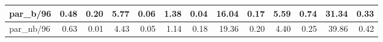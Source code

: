 \begin{tabular}{|lllllllllllll|}
\multicolumn{1}{|l|}{par\_b/96}  & \multicolumn{1}{r|}{0.48} & \multicolumn{1}{r|}{0.20} & \multicolumn{1}{r|}{5.77} & \multicolumn{1}{r|}{0.06}  & \multicolumn{1}{r|}{1.38} & \multicolumn{1}{r|}{0.04} & \multicolumn{1}{r|}{16.04} & \multicolumn{1}{r|}{0.17}  & \multicolumn{1}{r|}{5.59} & \multicolumn{1}{r|}{0.74} & \multicolumn{1}{r|}{31.34} & \multicolumn{1}{r|}{0.33}  \\ \hline
\multicolumn{1}{|l|}{par\_nb/96}  & \multicolumn{1}{r|}{0.63} & \multicolumn{1}{r|}{0.01} & \multicolumn{1}{r|}{4.43} & \multicolumn{1}{r|}{0.05}  & \multicolumn{1}{r|}{1.14} & \multicolumn{1}{r|}{0.18} & \multicolumn{1}{r|}{19.36} & \multicolumn{1}{r|}{0.20}  & \multicolumn{1}{r|}{4.40} & \multicolumn{1}{r|}{0.25} & \multicolumn{1}{r|}{39.86} & \multicolumn{1}{r|}{0.42}  \\ \hline
\end{tabular}
